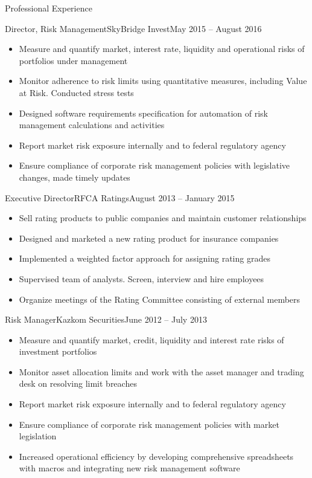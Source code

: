 \documentclass[]{mcdowellcv}
\begin{document}
\begin{cvsection}{Professional Experience}
  \begin{cvsubsection}{Director, Risk Management}{SkyBridge Invest}{May 2015 -- August 2016}		
    \begin{itemize}
      \item Measure and quantify market, interest rate, liquidity and operational risks of portfolios under management
      \item Monitor adherence to risk limits using quantitative measures, including Value at Risk. Conducted stress tests
      \item Designed software requirements specification for automation of risk management calculations and activities
      \item Report market risk exposure internally and to federal regulatory agency
      \item Ensure compliance of corporate risk management policies with legislative changes, made timely updates
    \end{itemize}
  \end{cvsubsection}

  \begin{cvsubsection}{Executive Director}{RFCA Ratings}{August 2013 -- January 2015}
    \begin{itemize}
      \item Sell rating products to public companies and maintain customer relationships
      \item Designed and marketed a new rating product for insurance companies
      \item Implemented a weighted factor approach for assigning rating grades
      \item Supervised team of analysts. Screen, interview and hire employees
      \item Organize meetings of the Rating Committee consisting of external members
    \end{itemize}
  \end{cvsubsection}

  \begin{cvsubsection}{Risk Manager}{Kazkom Securities}{June 2012 -- July 2013}
    \begin{itemize}
      \item Measure and quantify market, credit, liquidity and interest rate risks of investment portfolios
      \item Monitor asset allocation limits and work with the asset manager and trading desk on resolving limit breaches
      \item Report market risk exposure internally and to federal regulatory agency
      \item Ensure compliance of corporate risk management policies with market legislation
      \item Increased operational efficiency by developing comprehensive spreadsheets with macros and integrating new risk management software
    \end{itemize}
  \end{cvsubsection}
\end{cvsection}
\end{document}
